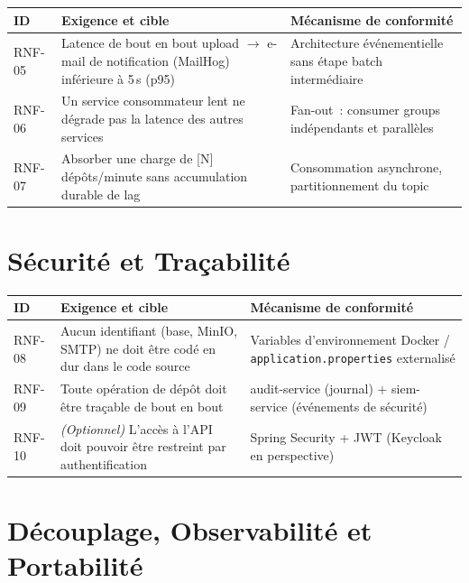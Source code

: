 \documentclass[12pt,a4paper,openany]{report}
\begin{document}
    \begin{longtable}{p{1.4cm}p{6.7cm}p{4cm}}
      \toprule
      \textbf{ID} & \textbf{Exigence et cible} & \textbf{M\'ecanisme de conformit\'e} \\
      \midrule
      \endhead
      \bottomrule
      \endfoot

      RNF-05 & Latence de bout en bout upload $\rightarrow$ e-mail de notification (MailHog) inf\'erieure \`a 5\,s (p95) & Architecture \'ev\'enementielle sans \'etape batch interm\'ediaire \\[4pt]
      RNF-06 & Un service consommateur lent ne d\'egrade pas la latence des autres services & Fan-out~: consumer groups ind\'ependants et parall\`eles \\[4pt]
      RNF-07 & Absorber une charge de [N] d\'ep\^ots/minute sans accumulation durable de lag & Consommation asynchrone, partitionnement du topic \\
    \end{longtable}

    \section{S\'ecurit\'e et Tra\c{c}abilit\'e}

    \begin{longtable}{p{1.4cm}p{6.7cm}p{4cm}}
      \toprule
      \textbf{ID} & \textbf{Exigence et cible} & \textbf{M\'ecanisme de conformit\'e} \\
      \midrule
      \endhead
      \bottomrule
      \endfoot

      RNF-08 & Aucun identifiant (base, MinIO, SMTP) ne doit \^etre cod\'e en dur dans le code source & Variables d'environnement Docker / \texttt{application.properties} externalis\'e \\[4pt]
      RNF-09 & Toute op\'eration de d\'ep\^ot doit \^etre tra\c{c}able de bout en bout & audit-service (journal) + siem-service (\'ev\'enements de s\'ecurit\'e) \\[4pt]
      RNF-10 & \textit{(Optionnel)} L'acc\`es \`a l'API doit pouvoir \^etre restreint par authentification & Spring Security + JWT (Keycloak en perspective) \\
    \end{longtable}

    \section{D\'ecouplage, Observabilit\'e et Portabilit\'e}
\end{document}
